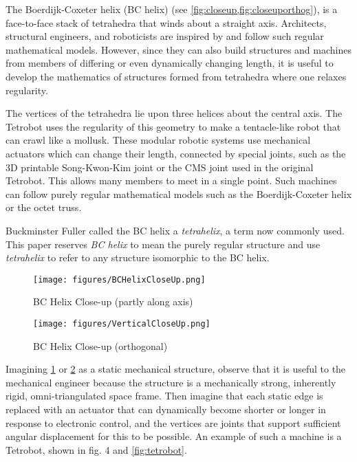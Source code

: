 \documentclass[10pt,final]{journals-1.0/asme2ej}
\begin{document}
The Boerdijk-Coxeter helix\cite{coxeter1985simplicial} (BC helix) (see \cref{fig:closeup,fig:closeuporthog}), is
a face-to-face stack of tetrahedra that winds about a straight axis.
Architects, structural engineers, and roboticists are inspired
by and follow such regular mathematical models.
However, since they can also build structures and
machines from members of differing or even dynamically changing length, it is
useful to develop the mathematics of structures formed from tetrahedra
where one relaxes regularity.


The vertices of the tetrahedra lie upon
three helices about the central axis.
The 
Tetrobot\cite{readglussbot,TetrobotBook} uses the regularity of
this geometry to make a tentacle-like robot that can crawl like a mollusk.
These modular robotic systems use mechanical actuators which can
change their length, connected by special joints,
such as the 3D printable Song-Kwon-Kim\cite{song2003spherical} joint or the CMS joint\cite{HamlinSandersonCMS}
used in the original Tetrobot.
This allows many members to meet in a single point.
Such machines can
follow purely regular mathematical models such as the Boerdijk-Coxeter
helix or the octet truss\cite{richard1961synergetic}.

Buckminster Fuller called the BC helix a \emph{tetrahelix}\cite{fuller1982synergetics},
a term now commonly used. This paper reserves \emph{BC helix} to mean the purely
regular structure and use \emph{tetrahelix} to refer
to any structure isomorphic to the BC helix.

\begin{figure}
  \centering
     \texttt{[image: figures/BCHelixCloseUp.png]}
     \caption{BC Helix Close-up (partly along axis)}
  \label{fig:closeup}     
\end{figure}
\begin{figure}
  \centering
     \texttt{[image: figures/VerticalCloseUp.png]}
     \caption{BC Helix Close-up (orthogonal)}
  \label{fig:closeuporthog}
\end{figure}

Imagining \cref{fig:closeup} or \cref{fig:closeuporthog} as a static mechanical structure,
observe that it is useful to the mechanical engineer
because the structure is a mechanically strong, inherently rigid,
omni-triangulated space frame.
Then imagine that each static edge is replaced with an
actuator that can dynamically become shorter or longer in response to electronic control,
and the vertices are joints that support sufficient angular displacement
for this to be possible. An example of such a machine is a Tetrobot,
shown in fig. 4 and \cref{fig:tetrobot}.
\end{document}
